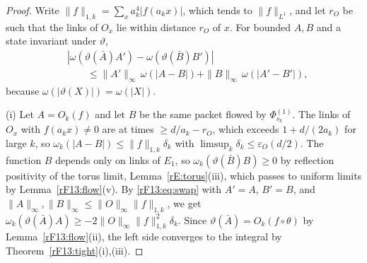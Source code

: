 \begin{proof}
Write $\|f\|_{1,k}=\sum_xa_k^4|f(a_kx)|$, which tends to $\|f\|_{L^1}$, and
let $r_O$ be such that the links of $O_x$ lie within distance $r_O$ of $x$.
For bounded $A,B$ and a state invariant under $\vartheta$,
\begin{equation}\label{rF13:eq:swap}
\begin{aligned}
&|\omega(\vartheta(\bar A)A')-\omega(\vartheta(\bar B)B')|\\
&\qquad\le\|A'\|_\infty\,\omega(|A-B|)+\|B\|_\infty\,\omega(|A'-B'|),
\end{aligned}
\end{equation}
because $\omega(|\vartheta(X)|)=\omega(|X|)$.

(i) Let $A=O_k(f)$ and let $B$ be the same packet flowed by $\Phi^{(1)}_{s_k}$.
The links of $O_x$ with $f(a_kx)\ne0$ are at times $\ge d/a_k-r_O$, which
exceeds $1+d/(2a_k)$ for large $k$, so $\omega_k(|A-B|)\le\|f\|_{1,k}\delta_k$
with $\limsup_k\delta_k\le\varepsilon_O(d/2)$. The function $B$ depends only
on links of $E_1$, so $\omega_k(\vartheta(\bar B)B)\ge0$ by reflection
positivity of the torus limit, Lemma~\ref{rE:torus}(iii), which passes to
uniform limits by Lemma~\ref{rF13:flow}(v). By
\eqref{rF13:eq:swap} with $A'=A$, $B'=B$, and $\|A\|_\infty,\|B\|_\infty\le
\|O\|_\infty\|f\|_{1,k}$, we get $\omega_k(\vartheta(\bar A)A)\ge-2\|O\|_\infty
\|f\|_{1,k}^2\delta_k$. Since $\vartheta(\bar A)=O_k(f\circ\theta)$ by
Lemma~\ref{rF13:flow}(ii), the left side converges to the integral by
Theorem~\ref{rF13:tight}(i),(iii).


\end{proof}
